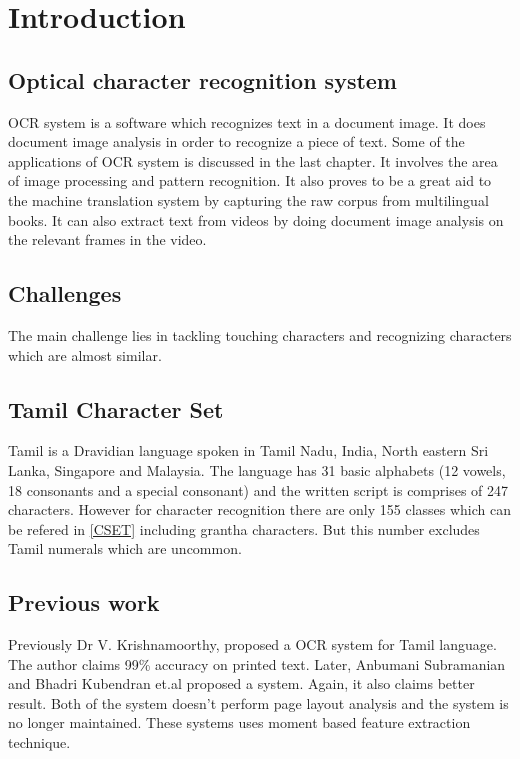 \chapter{Introduction}

\section{Optical character recognition system}
OCR system is a software which recognizes text in a document image. It does document 
image analysis in order to recognize a piece of text. Some of the applications of OCR system is
discussed in the last chapter. It involves the area of image processing and pattern recognition.
It also proves to be a great aid to the machine translation system by
capturing the raw corpus from multilingual books\cite{praveen}. It can also extract text from
videos by doing document image analysis on the relevant frames in the video.

\section{Challenges}
The main challenge lies in tackling touching characters and 
recognizing characters which are almost similar. 
\section{Tamil Character Set}
Tamil is a Dravidian language spoken in Tamil Nadu, India, North eastern Sri Lanka, Singapore and  Malaysia. The language has 31 basic alphabets (12 vowels, 18 consonants and a special consonant) and the written script is comprises of 247 characters. However for character recognition there are only 155 classes which can be refered in \ref{CSET} including grantha characters. But this number excludes Tamil numerals which are uncommon.


\section{Previous work}
Previously Dr V. Krishnamoorthy, proposed a OCR system for Tamil language. 
The author claims 99\% accuracy on printed text\cite{krish}. Later, Anbumani Subramanian and Bhadri Kubendran et.al proposed a system\cite{anbu}. Again, it also claims better result. Both of the system doesn't perform page layout analysis and the system is no longer maintained. These systems uses moment based feature extraction technique. 
